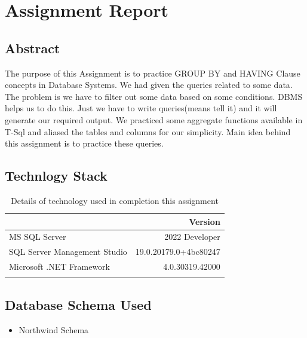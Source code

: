 \documentclass[12pt,a4paper]{report}
\begin{document}
\newpage
\thispagestyle{empty}
\tableofcontents


\newpage
\setcounter{page}{1}
\chapter{Assignment Report}
\section{Abstract}
The purpose of this Assignment is to practice GROUP BY and HAVING Clause concepts in Database Systems. We had given the queries related to some data. The problem is we have to filter out some data based on some conditions. DBMS helps us to do this. Just we have to write queries(means tell it) and it will generate our required output. We practiced some aggregate functions available in T-Sql and aliased the tables and columns for our simplicity. Main idea behind this assignment is to practice these queries.
\section{Technlogy Stack}
\begin{longtable}{lr} 
 \caption{Details of technology used in completion this assignment}\\
\begin{tabular}{ | m{6cm} | m{6cm}| } 
	\hline	
	\textbf{Technology} & \textbf{Version} \\ \hline
	MS SQL Server & 2022 Developer \\ \hline
	SQL Server Management Studio & 19.0.20179.0+4bc80247 \\ \hline
	Microsoft .NET Framework & 4.0.30319.42000 \\ \hline

\end{tabular}
\end{longtable}
\section{Database Schema Used}
\begin{itemize}
	\item Northwind Schema
\end{itemize}
\end{document}
